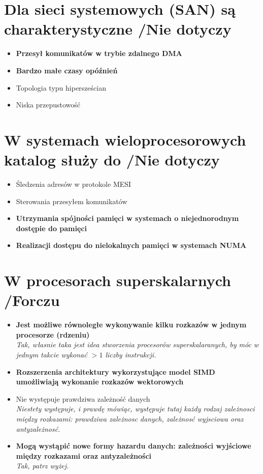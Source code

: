 \documentclass[a4paper,twoside]{article}
\begin{document}
\section{Dla sieci systemowych (SAN) są charakterystyczne {\small /Nie dotyczy}}
	\begin{itemize}
    \item \textbf{Przesył komunikatów w trybie zdalnego DMA}
    \item \textbf{Bardzo małe czasy opóźnień}
    \item Topologia typu hipersześcian
    \item Niska przepustowość
    \end{itemize}

\section{W systemach wieloprocesorowych katalog służy do {\small /Nie dotyczy}}
	\begin{itemize}
    \item Śledzenia adresów w protokole MESI
    \item Sterowania przesyłem komunikatów
    \item \textbf{Utrzymania spójności pamięci w systemach o niejednorodnym dostępie do pamięci}
    \item \textbf{Realizacji dostępu do nielokalnych pamięci w systemach NUMA}
    \end{itemize}

\section{W procesorach superskalarnych {\small /Forczu}}
	\begin{itemize}
    \item \textbf{Jest możliwe równoległe wykonywanie kilku rozkazów w jednym procesorze (rdzeniu)}\\
    {\small \emph{Tak, własnie taka jest idea stworzenia procesorów superskalaranych, by móc w jednym takcie wykonać $>1$ liczby instrukcji.}}
    \item \textbf{Rozszerzenia architektury wykorzystujące model SIMD umożliwiają wykonanie rozkazów wektorowych}
    \item Nie występuje prawdziwa zależność danych\\
    {\small \emph{Niestety występuje, i prawdę mówiąc, występuje tutaj każdy rodzaj zależnosci między rozkazami: prawdziwa zależnosc danych, zależnosć wyjsciowa oraz antyzależnosć.}}
    \item \textbf{Mogą wystąpić nowe formy hazardu danych: zależności wyjściowe między rozkazami oraz antyzależności}\\
    {\small \emph{Tak, patrz wyżej.}}
    \end{itemize}
\end{document}
